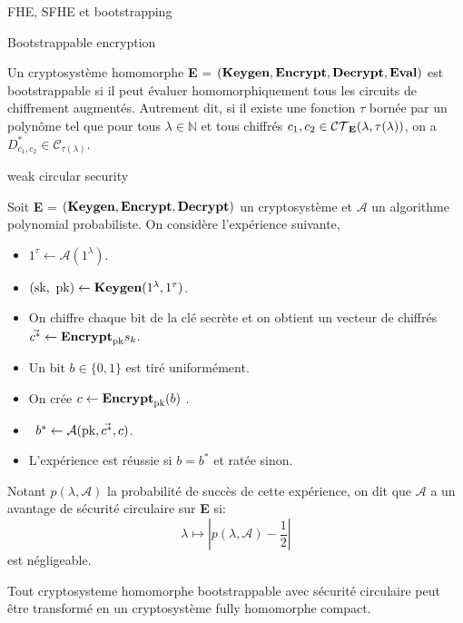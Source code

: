 \begin{section}{FHE, SFHE et bootstrapping}
\begin{definition}{Bootstrappable encryption}

Un cryptosystème homomorphe
\textbf{E} = $(\text{\textbf{Keygen}}, \text{\textbf{Encrypt}}, \text{\textbf{Decrypt}}, \text{\textbf{Eval}})$
est bootstrappable si il peut évaluer homomorphiquement tous les circuits 
de chiffrement augmentés. Autrement dit, si il existe une fonction $\tau$
bornée par un polynôme tel que pour tous $\lambda \in \mathbb{N}$ et tous
chiffrés  $c_1, c_2 \in \mathcal{CT}_{\text{\textbf{E}}}(\lambda, \tau(\lambda))$, on a
$D^*_{c_1,c_2} \in \mathcal{C}_{\tau(\lambda)}$.
\end{definition}

\begin{definition}{weak circular security}

\label{def:circular}
Soit \textbf{E} = $(\text{\textbf{Keygen}}, \text{\textbf{Encrypt}}, \text{\textbf{Decrypt}})$ un cryptosystème et $\mathcal{A}$ un
algorithme polynomial probabiliste. 
On considère l'expérience suivante, 
\begin{itemize}
\item $1^\tau \leftarrow \mathcal{A}(1^\lambda)$.
\item $(\sk, \pk) \leftarrow \Keygen(1^\lambda, 1^\tau)$.
\item On chiffre chaque bit de la clé secrète et on obtient un vecteur de chiffrés $\vec{c^*} \leftarrow \text{\textbf{Encrypt}}_{\text{pk}}{s_k}$.
\item Un bit $b\in \{0,1\}$ est tiré uniformément.
\item On crée $c \leftarrow \text{\textbf{Encrypt}}_{\text{pk}}(b)$ .
\item $b^* \leftarrow \mathcal{A}(\text{pk}, \vec{c^*}, c)$.
\item L'expérience est réussie si $b = b^*$ et ratée sinon.
\end{itemize}
Notant $p(\lambda, \mathcal{A})$ la probabilité de succès de cette expérience, on dit
que $\mathcal{A}$ a un avantage de sécurité circulaire sur \textbf{E} si:
\[\lambda \mapsto |p(\lambda, \mathcal{A}) - \frac{1}{2}| \]
est négligeable.
\end{definition}

\begin{thm}
Tout cryptosysteme homomorphe bootstrappable avec sécurité circulaire peut être transformé en un 
cryptosystème fully homomorphe compact.
\end{thm}
\end{section}
